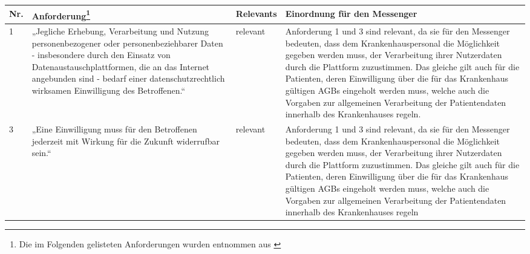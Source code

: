\begin{longtable}{p{0.6cm}|p{6cm}|p{2cm}|p{6cm}}
    \hline
    Nr. & 
    Anforderung\footnote{Die im Folgenden gelisteten Anforderungen wurden entnommen aus \cite[S. 41 ff.]{Bundesverband-Gesundheits-IT-e.V.2016}}                                                                                                                                         & Relevants          & Einordnung für den Messenger                                                                                                                                                                                                                                                                                                                                                                                                                                                                                                                                        \\ \hline
    1      & „Jegliche Erhebung, Verarbeitung und Nutzung personenbezogener oder personenbeziehbarer Daten - insbesondere durch den Einsatz von Datenaustauschplattformen, die an das Internet angebunden sind - bedarf einer datenschutzrechtlich wirksamen Einwilligung des Betroffenen.“                       & relevant           &   Anforderung 1 und 3 sind relevant, da sie für den Messenger bedeuten, dass dem Krankenhauspersonal die Möglichkeit gegeben werden muss, der Verarbeitung ihrer Nutzerdaten durch die Plattform zuzustimmen. Das gleiche gilt auch für die Patienten, deren Einwilligung über die für das Krankenhaus gültigen AGBs eingeholt werden muss, welche auch die Vorgaben zur allgemeinen Verarbeitung der Patientendaten innerhalb des Krankenhauses regeln.                                                                                                                        \\ \hline
    3      & „Eine Einwilligung muss für den Betroffenen jederzeit mit Wirkung für die Zukunft widerrufbar sein.“                                                                                                                                                                                                 & relevant           &   Anforderung 1 und 3 sind relevant, da sie für den Messenger bedeuten, dass dem Krankenhauspersonal die Möglichkeit gegeben werden muss, der Verarbeitung ihrer Nutzerdaten durch die Plattform zuzustimmen. Das gleiche gilt auch für die Patienten, deren Einwilligung über die für das Krankenhaus gültigen AGBs eingeholt werden muss, welche auch die Vorgaben zur allgemeinen Verarbeitung der Patientendaten innerhalb des Krankenhauses regeln                                                                                                                       \\ \hline

\end{longtable}
